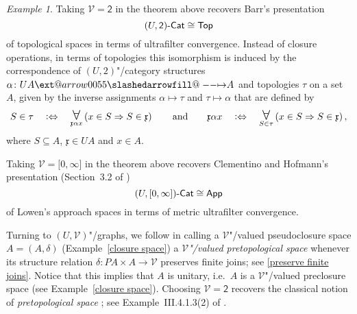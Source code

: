\documentclass[preprint, a4paper]{elsarticle}
\makeatletter
\def\slashedarrowfill@#1#2#3#4#5{%
  $\m@th\thickmuskip0mu\medmuskip\thickmuskip\thinmuskip\thickmuskip
   \relax#5#1\mkern-7mu%
   \cleaders\hbox{$#5\mkern-2mu#2\mkern-2mu$}\hfill
   \mathclap{#3}\mathclap{#2}%
   \cleaders\hbox{$#5\mkern-2mu#2\mkern-2mu$}\hfill
   \mkern-7mu#4$%
}
\def\rightslashedarrowfill@{%
  \slashedarrowfill@\relbar\relbar\mapstochar\rightarrow}
\newcommand\xslashedrightarrow[2][]{%
  \ext@arrow 0055{\rightslashedarrowfill@}{#1}{#2}}
\def\slashedrightarrow{\xslashedrightarrow{}}
\theoremstyle{definition}
\theoremstyle{remark}
\newtheorem{example}[theorem]{Example}
\providecommand{\exref}[1]{Example~\ref{#1}}
\newcommand\defeq{\mathrel{\vcentcolon\Leftrightarrow}}
\renewcommand{\implies}{\Rightarrow}
\providecommand{\iso}{\cong}
\providecommand{\mf}[1]{\mathfrak{#1}}
\providecommand{\brks}[1]{\lbrack #1 \rbrack}
\providecommand{\pars}[1]{\left(#1\right)}
\DeclareMathOperator\ForallOp{\mbox{\Large $\mathsurround0pt\forall$}}
\newcommand\Forall{\ForallOp\displaylimits}
\providecommand{\map}[3]{#1\colon#2\to#3}
\providecommand{\hmap}[3]{#1\colon#2\slashedrightarrow#3}
\providecommand{\catvar}[1]{\mathcal{#1}}
\providecommand{\2}{\mathsf 2}
\providecommand{\V}{\catvar V}
\providecommand{\Cat}{\mathsf{Cat}}
\providecommand{\enCat}[1]{#1\text-\Cat}
\providecommand{\Top}{\mathsf{Top}}
\providecommand{\App}{\mathsf{App}}
\makeatother
\begin{document}
  \begin{example} \label{ultrafilter convergence}
		Taking $\V = \2$ in the theorem above recovers Barr's presentation \cite{Barr70}
		\begin{displaymath}
			\enCat{(U, \2)} \iso \Top
		\end{displaymath}
		of topological spaces in terms of ultrafilter convergence. Instead of closure operations, in terms of topologies this isomorphism is induced by the correspondence of $(U, 2)$"/category structures $\hmap\alpha{UA}A$ and topologies $\tau$ on a set $A$, given by the inverse assignments $\alpha \mapsto \tau$ and $\tau \mapsto \alpha$ that are defined by
		\begin{displaymath}
			S \in \tau \quad \defeq \quad \Forall_{\mf x \alpha x} \pars{x \in S \implies S \in \mf x}
				\qquad \text{and} \qquad	\mf x \alpha x \quad \defeq \quad \Forall_{S \in \tau} \pars{x \in S \implies S \in \mf x},
		\end{displaymath}
		where $S \subseteq A$, $\mf x \in UA$ and $x \in A$.
		
		Taking $\V = \brks{0, \infty}$ in the theorem above recovers Clementino and Hofmann's presentation (Section~3.2 of \cite{Clementino-Hofmann03})
		\begin{displaymath}
			\enCat{(U, \brks{0, \infty})} \iso \App
		\end{displaymath}
		of Lowen's approach spaces in terms of metric ultrafilter convergence.
	\end{example}
	
	Turning to $(U, \V)$"/graphs, we follow \cite{Lai-Tholen17b} in calling a $\V$"/valued pseudoclosure space $A = (A, \delta)$ (\exref{closure space}) a \emph{$\V$"/valued pretopological space} whenever its structure relation $\map\delta{PA \times A}\V$ preserves finite joins; see \eqref{preserve finite joins}. Notice that this implies that $A$ is unitary, i.e.\ $A$ is a $\V$"/valued preclosure space (see \exref{closure space}). Choosing $\V = \2$ recovers the classical notion of \emph{pretopological space} \cite{Choquet48}; see Example~III.4.1.3(2) of \cite{Hofmann-Seal-Tholen14}.
	
\end{document}
